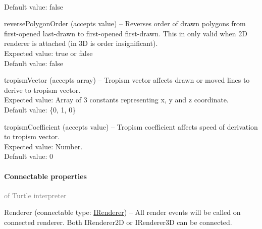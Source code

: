 \begin{description*}
			\\ Default value: false
		\item[reversePolygonOrder]
		(accepts value)
			-- Reverses order of drawn polygons from first-opened last-drawn to first-opened first-drawn.
            This in only valid when 2D renderer is attached (in 3D is order insignificant).
			\\ Expected value: true or false
			\\ Default value: false
		\item[tropismVector]
		(accepts array)
			-- Tropism vector affects drawn or moved lines to derive to tropism vector.
			\\ Expected value: Array of 3 constants representing x, y and z coordinate.
			\\ Default value: \{0, 1, 0\}
		\item[tropismCoefficient]
		(accepts value)
			-- Tropism coefficient affects speed of derivation to tropism vector.
			\\ Expected value: Number.
			\\ Default value: 0
	\end{description*}
	\paragraph{Connectable properties}\textcolor{gray}{of Turtle interpreter}
	\begin{description*}
		\item[Renderer]
		(connectable type:  \hyperref[Malsys.Processing.Components.IRenderer]{IRenderer})
			-- All render events will be called on connected renderer.
            Both IRenderer2D or IRenderer3D can be connected.
	\end{description*}
